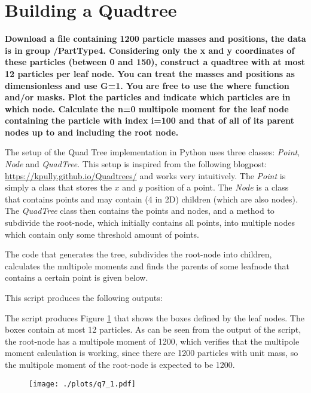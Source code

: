 \section{Building a Quadtree}
\textbf{Download a file containing 1200 particle masses and positions, the data is in group /PartType4. Considering only the x and y coordinates of these particles (between 0 and 150), construct a quadtree with at most 12 particles per leaf node. You can treat the masses and positions as dimensionless and use G=1. You are free to use the where function and/or masks. Plot the particles and indicate which particles are in which node. Calculate the n=0 multipole moment for the leaf node containing the particle with index i=100 and that of all of its parent nodes up to and including the root node.}


The setup of the Quad Tree implementation in Python uses three classes: \textit{Point}, \textit{Node} and \textit{QuadTree}. This setup is inspired from the following blogpost: \url{https://kpully.github.io/Quadtrees/} and works very intuitively.
The \textit{Point} is simply a class that stores the $x$ and $y$ position of a point. The \textit{Node} is a class that contains points and may contain (4 in 2D) children (which are also nodes). The \textit{QuadTree} class then contains the points and nodes, and a method to subdivide the root-node, which initially contains all points, into multiple nodes which contain only some threshold amount of points.

The code that generates the tree, subdivides the root-node into children, calculates the multipole moments and finds the parents of some leafnode that contains a certain point is given below.



This script produces the following outputs:


The script produces Figure \ref{fig:fig60} that shows the boxes defined by the leaf nodes. The boxes contain at most 12 particles. As can be seen from the output of the script, the root-node has a multipole moment of 1200, which verifies that the multipole moment calculation is working, since there are 1200 particles with unit mass, so the multipole moment of the root-node is expected to be 1200.

\begin{figure}[ht]\centering
\centering
\texttt{[image: ./plots/q7\_1.pdf]}
\captionsetup{width=0.8\linewidth}
\label{fig:fig60}
\end{figure}



